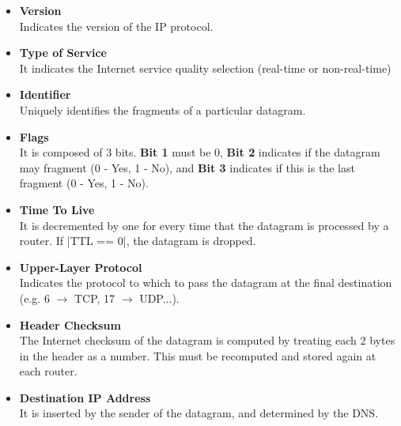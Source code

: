 \documentclass{article}
\begin{document}
\begin{itemize}
	\item \textbf{Version}
	\vspace{.2cm} \\
	Indicates the version of the IP protocol.
	
	\item \textbf{Type of Service}
	\vspace{.2cm} \\
	It indicates the Internet service quality selection (real-time or non-real-time)
	
	\item \textbf{Identifier}
	\vspace{.2cm} \\
	Uniquely identifies the fragments of a particular datagram.
	
	\item \textbf{Flags}
	\vspace{.2cm} \\
	It is composed of 3 bits. \textbf{Bit 1} must be 0, \textbf{Bit 2} indicates if the datagram may fragment (0 - Yes, 1 - No), and \textbf{Bit 3} indicates if this is the last fragment (0 - Yes, 1 - No).
	
	\item \textbf{Time To Live}
	\vspace{.2cm} \\
	It is decremented by one for every time that the datagram is processed by a router. If \cverb|TTL == 0|, the datagram is dropped.
	
	\item \textbf{Upper-Layer Protocol}
	\vspace{.2cm} \\
	Indicates the protocol to which to pass the datagram at the final destination (e.g. 6 $\rightarrow$ TCP, 17 $\rightarrow$ UDP...).
	
	\item \textbf{Header Checksum}
	\vspace{.2cm} \\
	The Internet checksum of the datagram is computed by treating each 2 bytes in the header as a number. This must be recomputed and stored again at each router.
	
	\item \textbf{Destination IP Address}
	\vspace{.2cm} \\
	It is inserted by the sender of the datagram, and determined by the DNS.
\end{itemize}
\end{document}
